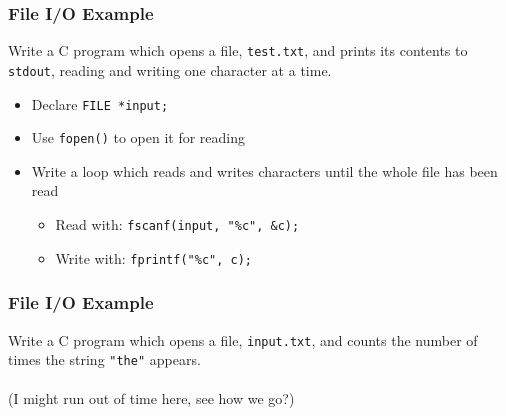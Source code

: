 \documentclass[14pt]{beamer}
\begin{document}
\begin{frame}
\frametitle{File I/O Example}
Write a C program which opens a file, \texttt{test.txt}, and prints its contents to \texttt{stdout}, reading and writing one character at a time.
\begin{itemize}
\pause
\item Declare \texttt{FILE *input;}
\pause
\item Use \texttt{fopen()} to open it for reading
\pause
\item Write a loop which reads and writes characters until the whole file has been read
	\begin{itemize}
		\item Read with: \texttt{fscanf(input, "\%c", \&c);}
		\item Write with: \texttt{fprintf("\%c", c);}
	\end{itemize}
\end{itemize}
\end{frame}

\begin{frame}
\frametitle{File I/O Example}
Write a C program which opens a file, \texttt{input.txt}, and counts the number of times the string \texttt{"the"} appears.
\\~\\
(I might run out of time here, see how we go?)
\end{frame}
\end{document}
